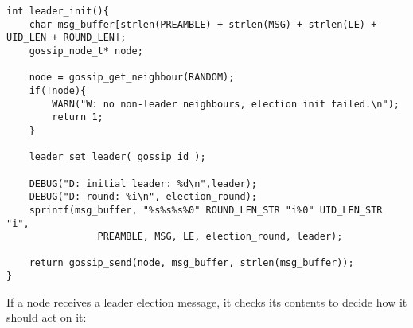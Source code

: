 \documentclass[11pt,
  a4paper,
  ngerman,
  BCOR=7mm
]{scrartcl}
\begin{document}
\begin{lstlisting}
int leader_init(){
    char msg_buffer[strlen(PREAMBLE) + strlen(MSG) + strlen(LE) + UID_LEN + ROUND_LEN];
    gossip_node_t* node;

    node = gossip_get_neighbour(RANDOM);
    if(!node){
        WARN("W: no non-leader neighbours, election init failed.\n");
        return 1;
    }

    leader_set_leader( gossip_id );

    DEBUG("D: initial leader: %d\n",leader);
    DEBUG("D: round: %i\n", election_round);
    sprintf(msg_buffer, "%s%s%s%0" ROUND_LEN_STR "i%0" UID_LEN_STR "i",
                PREAMBLE, MSG, LE, election_round, leader);

    return gossip_send(node, msg_buffer, strlen(msg_buffer));
}
\end{lstlisting}

If a node receives a leader election message, it checks its contents to
decide how it should act on it:
\end{document}
